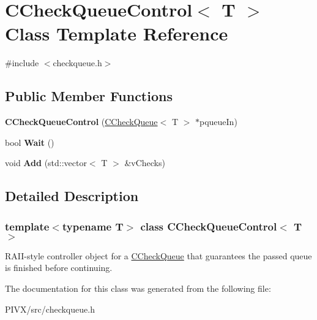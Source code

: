 \hypertarget{class_c_check_queue_control}{}\section{C\+Check\+Queue\+Control$<$ T $>$ Class Template Reference}
\label{class_c_check_queue_control}


{\ttfamily \#include $<$checkqueue.\+h$>$}

\subsection*{Public Member Functions}
\begin{DoxyCompactItemize}
\item 
\mbox{\label{class_c_check_queue_control_ae690afca20574a7c98e0c5e82011c606}} 
{\bfseries C\+Check\+Queue\+Control} (\mbox{\hyperlink{class_c_check_queue}{C\+Check\+Queue}}$<$ T $>$ $\ast$pqueue\+In)
\item 
\mbox{\label{class_c_check_queue_control_ab31d809a76b876d21608c0c5d0e3baf0}} 
bool {\bfseries Wait} ()
\item 
\mbox{\label{class_c_check_queue_control_aa11e8248c91b0758b39132db4090ff8d}} 
void {\bfseries Add} (std\+::vector$<$ T $>$ \&v\+Checks)
\end{DoxyCompactItemize}


\subsection{Detailed Description}
\subsubsection*{template$<$typename T$>$\newline
class C\+Check\+Queue\+Control$<$ T $>$}

R\+A\+I\+I-\/style controller object for a \mbox{\hyperlink{class_c_check_queue}{C\+Check\+Queue}} that guarantees the passed queue is finished before continuing. 

The documentation for this class was generated from the following file\+:\begin{DoxyCompactItemize}
\item 
P\+I\+V\+X/src/checkqueue.\+h\end{DoxyCompactItemize}
